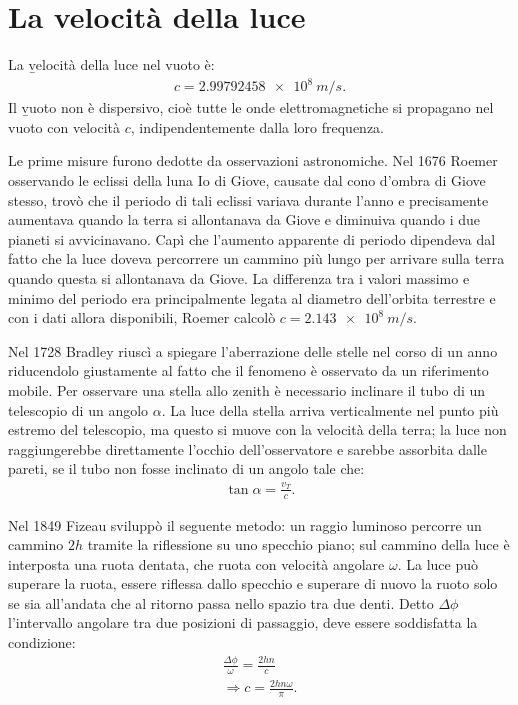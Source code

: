 \section{La velocità della luce}%
La \b{velocità della luce nel vuoto} è:
\begin{equation}\begin{split}
c=\SI{2.99792458e8}{m/s}.
\end{split}\end{equation}
Il \b{vuoto non è dispersivo}, cioè tutte le onde elettromagnetiche si propagano nel vuoto con velocità $c$, indipendentemente dalla loro frequenza.

Le prime misure furono dedotte da osservazioni astronomiche. Nel 1676 Roemer osservando le eclissi della luna Io di Giove, causate dal cono d'ombra di Giove stesso, trovò che il periodo di tali eclissi variava durante l'anno e precisamente aumentava quando la terra si allontanava da Giove e diminuiva quando i due pianeti si avvicinavano. Capì che l'aumento apparente di periodo dipendeva dal fatto che la luce doveva percorrere un cammino più lungo per arrivare sulla terra quando questa si allontanava da Giove. La differenza tra i valori massimo e minimo del periodo era principalmente legata al diametro dell'orbita terrestre e con i dati allora disponibili, Roemer calcolò $c=\SI{2.143e8}{m/s}$.

Nel 1728 Bradley riuscì a spiegare l'aberrazione delle stelle nel corso di un anno riducendolo giustamente al fatto che il fenomeno è osservato da un riferimento mobile. Per osservare una stella allo zenith è necessario inclinare il tubo di un telescopio di un angolo $\alpha$. La luce della stella arriva verticalmente nel punto più estremo del telescopio, ma questo si muove con la velocità della terra; la luce non raggiungerebbe direttamente l'occhio dell'osservatore e sarebbe assorbita dalle pareti, se il tubo non fosse inclinato di un angolo tale che:
\begin{equation}\begin{split}
\tan{\alpha}=\frac{v_T}{c}.
\end{split}\end{equation}

Nel 1849 Fizeau sviluppò il seguente metodo: un raggio luminoso percorre un cammino $2h$ tramite la riflessione su uno specchio piano; sul cammino della luce è interposta una ruota dentata, che ruota con velocità angolare $\omega$. La luce può superare la ruota, essere riflessa dallo specchio e superare di nuovo la ruoto solo se sia all'andata che al ritorno passa nello spazio tra due denti. Detto $\Delta \phi$ l'intervallo angolare tra due posizioni di passaggio, deve essere soddisfatta la condizione:
\begin{equation}\begin{split}
\frac{\Delta \phi}{\omega}=\frac{2hn}{c}\\
\Longrightarrow c=\frac{2hn\omega}{\pi}.
\end{split}\end{equation}

